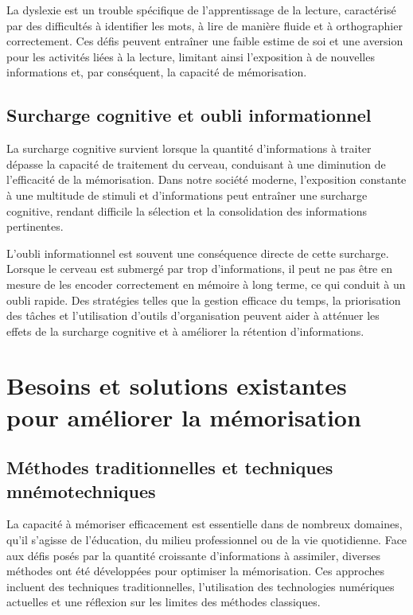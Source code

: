 \documentclass[12pt,a4paper]{report}
\begin{document}
La dyslexie est un trouble spécifique de l'apprentissage de la lecture, caractérisé par des difficultés à identifier les mots, à lire de manière fluide et à orthographier correctement. Ces défis peuvent entraîner une faible estime de soi et une aversion pour les activités liées à la lecture, limitant ainsi l'exposition à de nouvelles informations et, par conséquent, la capacité de mémorisation. \cite{tdah}

\subsection{Surcharge cognitive et oubli informationnel}

La surcharge cognitive survient lorsque la quantité d'informations à traiter dépasse la capacité de traitement du cerveau, conduisant à une diminution de l'efficacité de la mémorisation. Dans notre société moderne, l'exposition constante à une multitude de stimuli et d'informations peut entraîner une surcharge cognitive, rendant difficile la sélection et la consolidation des informations pertinentes.

L'oubli informationnel est souvent une conséquence directe de cette surcharge. \cite{dyscoaching} Lorsque le cerveau est submergé par trop d'informations, il peut ne pas être en mesure de les encoder correctement en mémoire à long terme, ce qui conduit à un oubli rapide. Des stratégies telles que la gestion efficace du temps, la priorisation des tâches et l'utilisation d'outils d'organisation peuvent aider à atténuer les effets de la surcharge cognitive et à améliorer la rétention d'informations.

\newpage

\section{Besoins et solutions existantes pour améliorer la mémorisation}

\subsection{Méthodes traditionnelles et techniques mnémotechniques}

La capacité à mémoriser efficacement est essentielle dans de nombreux domaines, qu'il s'agisse de l'éducation, du milieu professionnel ou de la vie quotidienne. Face aux défis posés par la quantité croissante d'informations à assimiler, diverses méthodes ont été développées pour optimiser la mémorisation. Ces approches incluent des techniques traditionnelles, l'utilisation des technologies numériques actuelles et une réflexion sur les limites des méthodes classiques.
\end{document}
